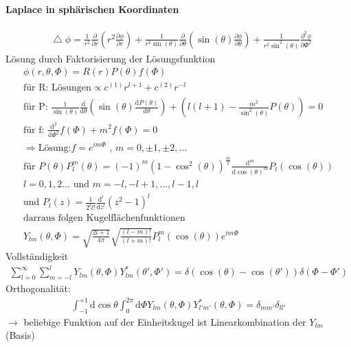 \documentclass[a4paper]{article}
\newcommand*\laplace{\mathop{}\!\mathbin\bigtriangleup}
\begin{document}
\paragraph{Laplace in sphärischen Koordinaten}
\begin{align}
\laplace\phi=\frac{1}{r^2}\frac{\partial}{\partial r}\left( r^2
\frac{\partial\phi}{\partial r} \right)+\frac{1}{r^2 \sin(\theta)}
\frac{\partial}{\partial \theta}\left( \sin(\theta) \frac{\partial\phi} 
{\partial \theta} \right)+\frac{1}{r^2 \sin^2(\theta)} \frac{\partial^2\phi} 
{\partial \Phi^2}
\end{align}
Lösung durch Faktorisierung der Lösungsfunktion 
\begin{align}
\phi(r,\theta,\Phi)=R(r)P(\theta)f(\Phi)\\
\text{für R:  Lösungen}\propto c^{(1)}r^{l+1}+c^{(2)} r^{-l}\\
\text{für P:  }\frac{1}{\sin(\theta)}\frac{\mathrm{d}}{\mathrm{d}\theta}\left( \sin(\theta)
\frac{\mathrm{d}P(\theta)}{\mathrm{d}\theta}\right)+\left( l(l+1)-\frac{m^2}{\sin^2(\theta)} 
P(\theta) \right)=0\\
\text{für f:  }\frac{\mathrm{d}^2}{\mathrm{d}\Phi^2}f(\Phi)+m^2f(\Phi)=0\\
\Rightarrow \text{Lösung:} f=e^{im\Phi} \text{ , }m=0,\pm1,\pm2,\ldots\\
\text{für }P(\theta) P_l^m(\theta)=(-1)^m
(1-\cos^2(\theta))^{\frac{m}{2}}\frac{\mathrm{d}^m}{\mathrm{d}\cos(\theta)^m}P_l(\cos(\theta))\\
l=0,1,2\ldots \text{ und } m=-l,-l+1,\ldots,l-1,l\\
\text{und }P_l(z)=\frac{1}{2^ll!}\frac{\mathrm{d}^l}{\mathrm{d}z^l}(z^2-1)^l\\
\text{darraus folgen Kugelflächenfunktionen}\\
Y_{lm}(\theta,\Phi)=\sqrt{\frac{2l+1}{4\pi}}\sqrt{\frac{(l-m)!}{(l+m)!}}
P^m_l(\cos(\theta))e^{im\Phi}
\end{align}
Vollständigkeit
\begin{align}
\sum_{l=0}^\infty\sum_{m=-l}^l Y_{lm}(\theta,\Phi) Y_{lm}^*(\theta',\Phi')
=\delta(\cos(\theta)-\cos(\theta'))\delta(\Phi-\Phi')
\end{align}
Orthogonalität:
\begin{align}
\int_{-1}^{+1}\mathrm{d}\cos\theta\int_0^{2\pi}\mathrm{d}\Phi Y_{lm}(\theta,\Phi)
Y_{l'm'}^*(\theta,\Phi)=\delta_{mm'}\delta_{ll'}
\end{align}
$\rightarrow$ beliebige Funktion auf der Einheitskugel ist Linearkombination
der $Y_{lm}$ (Basis)
\end{document}
